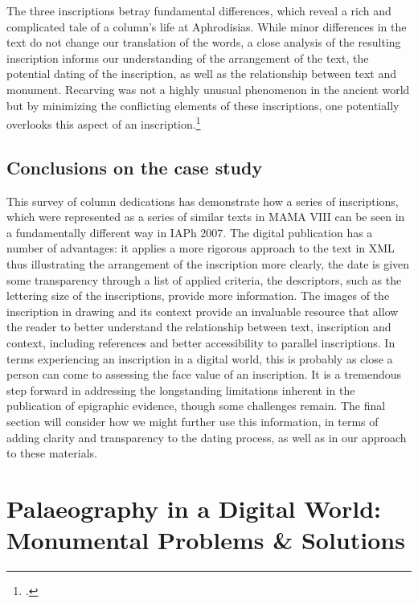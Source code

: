 \documentclass[amsthm,ebook]{saparticle}
\begin{document}
The three inscriptions betray fundamental differences, which reveal a rich and complicated tale of a column’s life at
Aphrodisias. While minor differences in the text do not change our translation of the words, a close analysis of the
resulting inscription informs our understanding of the arrangement of the text, the potential dating of the
inscription, as well as the relationship between text and monument. Recarving was not a highly unusual phenomenon in
the ancient world but by minimizing the conflicting elements of these inscriptions, one potentially overlooks this
aspect of an inscription.\footnote{\citet[135-177]{thomas1990}.} 




\subsection{Conclusions on the case study}
\noindent This survey of column dedications has demonstrate how a series of inscriptions, which were represented as a series of
similar texts in MAMA VIII can be seen in a fundamentally different way in IAPh 2007. The digital publication has a
number of advantages: it applies a more rigorous approach to the text in XML thus illustrating the arrangement of the
inscription more clearly, the date is given some transparency through a list of applied criteria, the descriptors, such
as the lettering size of the inscriptions, provide more information. The images of the inscription in drawing and its
context provide an invaluable resource that allow the reader to better understand the relationship between text,
inscription and context, including references and better accessibility to parallel inscriptions. In terms experiencing
an inscription in a digital world, this is probably as close a person can come to assessing the face value of an
inscription. It is a tremendous step forward in addressing the longstanding limitations inherent in the publication
of epigraphic evidence, though some challenges remain. The final section will consider how we might further use this
information, in terms of adding clarity and transparency to the dating process, as well as in our approach to these
materials.




\section{Palaeography in a Digital World: Monumental Problems \& Solutions}
\end{document}
